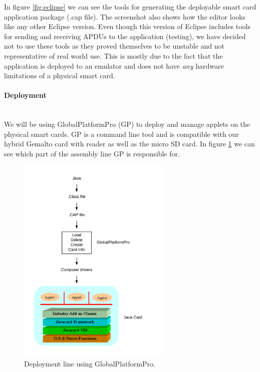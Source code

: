 In figure \ref{fig:eclipse} we can see the tools for generating the deployable smart card application package (.cap file). The screenshot also shows how the editor looks like any other Eclipse version. Even though this version of Eclipse includes tools for sending and receiving APDUs to the application (testing), we have decided not to use these tools as they proved themselves to be unstable and not representative of real world use. This is mostly due to the fact that the application is deployed to an emulator and does not have \textit{any} hardware limitations of a physical smart card.

\paragraph{Deployment}\mbox{}\\
We will be using GlobalPlatformPro (GP) \cite{globalplatform} to deploy and manage applets on the physical smart cards. GP is a command line tool and is compatible with our hybrid Gemalto card with reader as well as the micro SD card. In figure \ref{fig:deployFlow} we can see which part of the assembly line GP is responsible for.

\begin{figure}[h!]
  \caption{Deployment line using GlobalPlatformPro.}
  \label{fig:deployFlow}
  \centering
    \includegraphics[width=0.65\textwidth]{images/deployFlow.png}
\end{figure}

